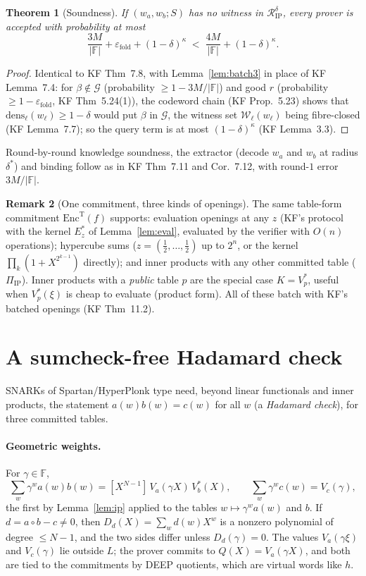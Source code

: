 \documentclass[11pt]{article}
\newtheorem{theorem}{Theorem}
\theoremstyle{definition}
\newtheorem{remark}[theorem]{Remark}
\newcommand{\F}{\mathbb{F}}
\newcommand{\coef}[2]{[X^{#1}]\,#2}
\begin{document}
\begin{theorem}[Soundness]
If $(w_a,w_b;S)$ has no witness in $\mathcal R^\delta_{\mathrm{IP}}$, every prover is accepted with probability at most
\[\frac{3M}{|\F|}+\varepsilon_{\mathrm{fold}}+(1-\delta)^\kappa\;<\;\frac{4M}{|\F|}+(1-\delta)^\kappa.\]
\end{theorem}
\begin{proof}
Identical to KF Thm~7.8, with Lemma~\ref{lem:batch3} in place of KF Lemma~7.4: for $\beta\notin\mathcal G$ (probability $\ge1-3M/|\F|$) and good $r$ (probability $\ge1-\varepsilon_{\mathrm{fold}}$, KF Thm~5.24(1)), the codeword chain (KF Prop.~5.23) shows that $\mathrm{dens}_\ell(w_\ell)\ge1-\delta$ would put $\beta$ in $\mathcal G$, the witness set $\mathcal W_\ell(w_\ell)$ being fibre-closed (KF Lemma~7.7); so the query term is at most $(1-\delta)^\kappa$ (KF Lemma~3.3).
\end{proof}

Round-by-round knowledge soundness, the extractor (decode $w_a$ and $w_b$ at radius $\delta^\ast$) and binding follow as in KF Thm~7.11 and Cor.~7.12, with round-$1$ error $3M/|\F|$.

\begin{remark}[One commitment, three kinds of openings]
The same table-form commitment $\mathrm{Enc}^{\mathrm T}(f)$ supports: evaluation openings at any $z$ (KF's protocol with the kernel $E^\ast_z$ of Lemma~\ref{lem:eval}, evaluated by the verifier with $O(n)$ operations); hypercube sums ($z=(\tfrac12,\dots,\tfrac12)$ up to $2^n$, or the kernel $\prod_k(1+X^{2^{k-1}})$ directly); and inner products with any other committed table ($\Pi_{\mathrm{IP}}$).
Inner products with a \emph{public} table $p$ are the special case $K=V_p^\ast$, useful when $V_p^\ast(\xi)$ is cheap to evaluate (product form).
All of these batch with KF's batched openings (KF Thm~11.2).
\end{remark}

\section{A sumcheck-free Hadamard check}

SNARKs of Spartan/HyperPlonk type need, beyond linear functionals and inner products, the statement $a(w)b(w)=c(w)$ for all $w$ (a \emph{Hadamard check}), for three committed tables.

\paragraph{Geometric weights.} For $\gamma\in\F$,
\[
\sum_w\gamma^wa(w)b(w)=\coef{N-1}{V_a(\gamma X)\,V_b^\ast(X)},\qquad
\sum_w\gamma^wc(w)=V_c(\gamma),
\]
the first by Lemma~\ref{lem:ip} applied to the tables $w\mapsto\gamma^wa(w)$ and $b$.
If $d=a\circ b-c\ne0$, then $D_d(X)=\sum_wd(w)X^w$ is a nonzero polynomial of degree $\le N-1$, and the two sides differ unless $D_d(\gamma)=0$.
The values $V_a(\gamma\xi)$ and $V_c(\gamma)$ lie outside $L$; the prover commits to $Q(X)=V_a(\gamma X)$, and both are tied to the commitments by DEEP quotients, which are virtual words like $h$.
\end{document}
